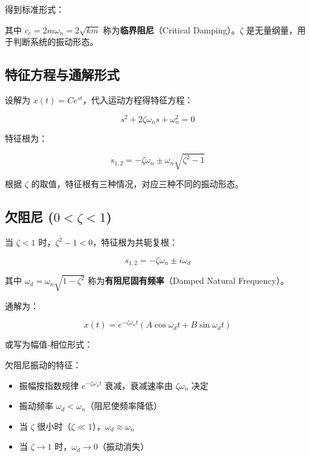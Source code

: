 得到标准形式：
\begin{myformula}
    \end{myformula}

其中 $c_c = 2m\omega_n = 2\sqrt{km}$ 称为\textbf{临界阻尼}（Critical Damping）。$\zeta$ 是无量纲量，用于判断系统的振动形态。

\subsection{特征方程与通解形式}

设解为 $x(t) = Ce^{st}$，代入运动方程得特征方程：
\begin{myformula}
    \[
    s^2 + 2\zeta\omega_n s + \omega_n^2 = 0
    \]
\end{myformula}

特征根为：
\begin{myformula}
    \[
    s_{1,2} = -\zeta\omega_n \pm \omega_n\sqrt{\zeta^2 - 1}
    \]
\end{myformula}

根据 $\zeta$ 的取值，特征根有三种情况，对应三种不同的振动形态。

\subsection{欠阻尼 ($0 < \zeta < 1$)}

当 $\zeta < 1$ 时，$\zeta^2 - 1 < 0$，特征根为共轭复根：
\begin{myformula}
    \[
    s_{1,2} = -\zeta\omega_n \pm i\omega_d
    \]
\end{myformula}
其中 $\omega_d = \omega_n\sqrt{1-\zeta^2}$ 称为\textbf{有阻尼固有频率}（Damped Natural Frequency）。

通解为：
\begin{myformula}
    \[
    x(t) = e^{-\zeta\omega_n t}\left(A\cos\omega_d t + B\sin\omega_d t\right)
    \]
\end{myformula}

或写为幅值-相位形式：
\begin{myformula}
    \end{myformula}

欠阻尼振动的特征：
\begin{itemize}
    \item 振幅按指数规律 $e^{-\zeta\omega_n t}$ 衰减，衰减速率由 $\zeta\omega_n$ 决定
    \item 振动频率 $\omega_d < \omega_n$（阻尼使频率降低）
    \item 当 $\zeta$ 很小时（$\zeta \ll 1$），$\omega_d \approx \omega_n$
    \item 当 $\zeta \to 1$ 时，$\omega_d \to 0$（振动消失）
\end{itemize}

